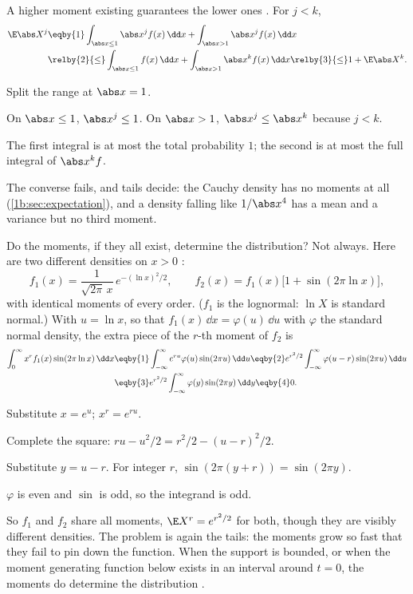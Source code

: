 A higher moment existing guarantees the lower ones . For $j<k$,
\begin{align*}
  \E\abs X^j
  &\eqby{1} \int_{\abs x\le1}\abs x^jf(x)\,\dd x+\int_{\abs x>1}\abs x^jf(x)\,\dd x\\
  &\relby{2}{\le} \int_{\abs x\le1}f(x)\,\dd x+\int_{\abs x>1}\abs x^kf(x)\,\dd x
   \relby{3}{\le} 1+\E\abs X^k .
\end{align*}
\begin{explain}
  \item Split the range at $\abs x=1$.
  \item On $\abs x\le1$, $\abs x^j\le1$. On $\abs x>1$, $\abs x^j\le\abs x^k$
        because $j<k$.
  \item The first integral is at most the total probability $1$; the second is
        at most the full integral of $\abs x^kf$.
\end{explain}
The converse fails, and tails decide: the Cauchy density has no moments at all
(\cref{1b:sec:expectation}), and a density falling like $1/\abs x^{4}$ has a
mean and a variance but no third moment.

Do the moments, if they all exist, determine the distribution? Not always.
Here are two different densities on $x>0$
:
\[
  f_1(x)=\frac{1}{\sqrt{2\pi}\,x}\,e^{-(\ln x)^2/2},\qquad
  f_2(x)=f_1(x)\bigl[1+\sin(2\pi\ln x)\bigr],
\]
with identical moments of every order. ($f_1$ is the lognormal: $\ln X$ is
standard normal.) With $u=\ln x$, so that $f_1(x)\,\dd x=\varphi(u)\,\dd u$
with $\varphi$ the standard normal density, the extra piece of the $r$-th
moment of $f_2$ is
\begin{align*}
  \int_0^\infty x^rf_1(x)\sin(2\pi\ln x)\,\dd x
  &\eqby{1} \int_{-\infty}^{\infty}e^{ru}\varphi(u)\sin(2\pi u)\,\dd u
   \eqby{2} e^{r^2/2}\int_{-\infty}^{\infty}\varphi(u-r)\sin(2\pi u)\,\dd u\\
  &\eqby{3} e^{r^2/2}\int_{-\infty}^{\infty}\varphi(y)\sin(2\pi y)\,\dd y
   \eqby{4} 0 .
\end{align*}
\begin{explain}
  \item Substitute $x=e^u$; $x^r=e^{ru}$.
  \item Complete the square: $ru-u^2/2=r^2/2-(u-r)^2/2$.
  \item Substitute $y=u-r$. For integer $r$, $\sin(2\pi(y+r))=\sin(2\pi y)$.
  \item $\varphi$ is even and $\sin$ is odd, so the integrand is odd.
\end{explain}
So $f_1$ and $f_2$ share all moments, $\E X^r=e^{r^2/2}$ for both, though they
are visibly different densities. The problem is again the tails: the moments
grow so fast that they fail to pin down the function. When the support is
bounded, or when the moment generating function below exists in an interval
around $t=0$, the moments do determine the distribution
.

